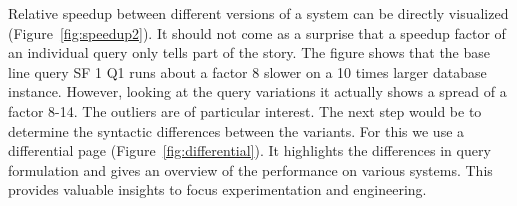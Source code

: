 \documentclass{cidr-2019}
\begin{document}
Relative speedup between different versions of a system can be
directly visualized (Figure~\ref{fig:speedup2}). It should not come
as a surprise that a speedup factor of an individual query only tells
part of the story. The figure shows that the base line query SF 1
Q1
runs about a factor 8
slower on a 10 times larger database instance.  However, looking at
the query variations it actually shows a spread of a factor 8-14. The
outliers are of particular interest. The next step would be to
determine the syntactic differences between the variants. For this we
use a differential page (Figure~\ref{fig:differential}). It highlights
the differences in query formulation and gives an overview of the
performance on various systems. This provides valuable insights to
focus experimentation and engineering.




\end{document}
